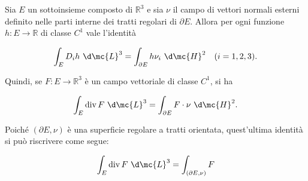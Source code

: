 \begin{shadedTheorem}\label{thm: 2.12 Gauss 3D}
    Sia $E$ un sottoinsieme composto di $\mathbb{R}^{3}$ e sia $\nu$ il campo di vettori normali esterni definito nelle parti interne dei tratti regolari di $\partial E$. Allora per ogni funzione $h: E \rightarrow \mathbb{R}$ di classe $C^{1}$ vale l'identità

    \[
    \int_{E} D_{i} h\ \d \mc{L}^{3}=\int_{\partial E} h \nu_{i}\ \d \mc{H}^{2} \quad(i=1,2,3) .
    \]

    Quindi, se $F: E \rightarrow \mathbb{R}^{3}$ è un campo vettoriale di classe $C^{1}$, si ha

    \[
    \int_{E} \operatorname{div} F\ \d \mc{L}^{3}=\int_{\partial E} F \cdot \nu\ \d \mc{H}^{2} .
    \]

    Poiché $(\partial E, \nu)$ è una superficie regolare a tratti orientata, quest'ultima identità si può riscrivere come segue:

    \[
    \int_{E} \operatorname{div} F\ \d \mc{L}^{3}=\int_{(\partial E, \nu)} F
    \]
\end{shadedTheorem}

